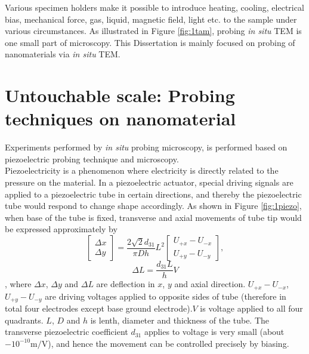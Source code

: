 Various specimen holders make it possible to introduce heating, cooling, electrical bias, mechanical force, gas, liquid, magnetic field, light etc. to the sample under various circumstances. As illustrated in Figure \ref{fig:1tam}, probing \emph{in situ} TEM is one small part of microscopy. This Dissertation is mainly focused on probing of nanomaterials via \emph{in situ} TEM. 

\section{Untouchable scale: Probing techniques on nanomaterial}

Experiments performed by \emph{in situ} probing microscopy, is performed based on piezoelectric probing technique and microscopy. \\
Piezoelectricity is a phenomenon where electricity is directly related to the pressure on the material. In a piezoelectric actuator, special driving signals are applied to a piezoelectric tube in certain directions, and thereby the piezoelectric tube would respond to change shape accordingly.\cite{okada2004piezoelectric,vishnevsky1977piezoelectric} As shown in Figure \ref{fig:1piezo}, when base of the tube is fixed, transverse and axial movements of tube tip would be expressed approximately by
$$\begin{bmatrix}\Delta x\\ \Delta y\end{bmatrix}= \frac{2\sqrt{2}d_{31}}{\pi Dh}L^2\begin{bmatrix}U_{+x}-U_{-x}\\U_{+y}-U_{-y} \end{bmatrix},$$
$$\Delta L= \frac{d_{31}L}{h}V$$
, where $\Delta x$, $\Delta y$ and $\Delta L$ are deflection in $x$, $y$ and axial direction. $U_{+x}-U_{-x}$, $U_{+y}-U_{-y}$ are driving voltages applied to opposite sides of tube (therefore in total four electrodes except base ground electrode).$V$ is voltage applied to all four quadrants. $L$, $D$ and $h$ is lenth, diameter and thickness of the tube. The transverse piezoelectric coefficient $d_{31}$ applies to voltage is very small (about $-10^{-10} \mathrm{m/V}$), and hence the movement can be controlled precisely by biasing. 

